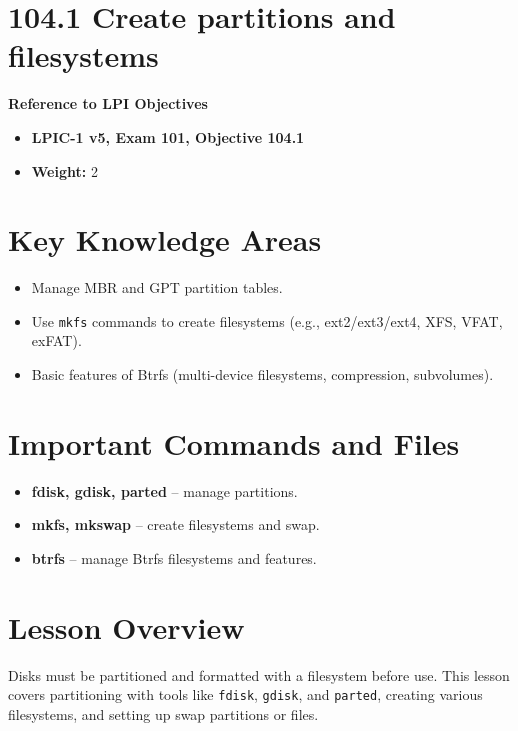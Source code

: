 \documentclass[a4paper]{report}
\begin{document}
\newpage
\section*{104.1 Create partitions and filesystems}

\textbf{Reference to LPI Objectives}
\begin{itemize}
    \item \textbf{LPIC-1 v5, Exam 101, Objective 104.1}
    \item \textbf{Weight:} 2
\end{itemize}

\section*{Key Knowledge Areas}
\begin{itemize}
    \item Manage MBR and GPT partition tables.
    \item Use \texttt{mkfs} commands to create filesystems (e.g., ext2/ext3/ext4, XFS, VFAT, exFAT).
    \item Basic features of Btrfs (multi-device filesystems, compression, subvolumes).
\end{itemize}

\section*{Important Commands and Files}
\begin{itemize}
    \item \textbf{fdisk, gdisk, parted} – manage partitions.
    \item \textbf{mkfs, mkswap} – create filesystems and swap.
    \item \textbf{btrfs} – manage Btrfs filesystems and features.
\end{itemize}

\section*{Lesson Overview}
Disks must be partitioned and formatted with a filesystem before use. This lesson covers partitioning with tools like \texttt{fdisk}, \texttt{gdisk}, and \texttt{parted}, creating various filesystems, and setting up swap partitions or files.
\end{document}
